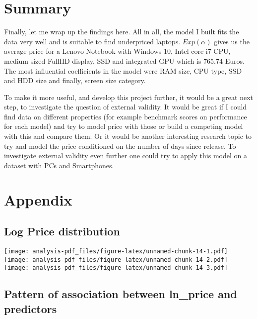 \documentclass[
]{article}
\begin{document}
\hypertarget{summary}{%
\section{Summary}\label{summary}}

Finally, let me wrap up the findings here. All in all, the model I built
fits the data very well and is suitable to find underpriced laptops.
\(Exp(\alpha)\) gives us the average price for a Lenovo Notebook with
Windows 10, Intel core i7 CPU, medium sized FullHD display, SSD and
integrated GPU which is 765.74 Euros. The most influential coefficients
in the model were RAM size, CPU type, SSD and HDD size and finally,
screen size category.

To make it more useful, and develop this project further, it would be a
great next step, to investigate the question of external validity. It
would be great if I could find data on different properties (for example
benchmark scores on performance for each model) and try to model price
with those or build a competing model with this and compare them. Or it
would be another interesting research topic to try and model the price
conditioned on the number of days since release. To investigate external
validity even further one could try to apply this model on a dataset
with PCs and Smartphones.

\hypertarget{appendix}{%
\section{Appendix}\label{appendix}}

\hypertarget{log-price-distribution}{%
\subsection{Log Price distribution}\label{log-price-distribution}}

\texttt{[image: analysis-pdf\_files/figure-latex/unnamed-chunk-14-1.pdf]}
\texttt{[image: analysis-pdf\_files/figure-latex/unnamed-chunk-14-2.pdf]}
\texttt{[image: analysis-pdf\_files/figure-latex/unnamed-chunk-14-3.pdf]}

\hypertarget{pattern-of-association-between-ln_price-and-predictors}{%
\subsection{Pattern of association between ln\_price and
predictors}\label{pattern-of-association-between-ln_price-and-predictors}}
\end{document}
